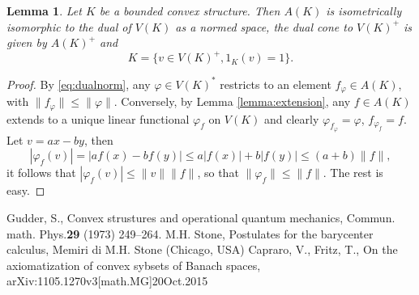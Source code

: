\documentclass[12pt,letterpaper]{article}
\newtheorem{lemma}{Lemma}[section]
\begin{document}
\begin{lemma} Let $K$ be a bounded convex structure. Then  $A(K)$ is isometrically isomorphic to the dual of $V(K)$ as a normed space,  the dual cone to $V(K)^+$ is given by $A(K)^+$ and 
\[
K=\{v\in V(K)^+, 1_K(v)=1\}.
\]
\end{lemma}

\begin{proof} By \eqref{eq:dualnorm}, any $\varphi\in V(K)^*$ restricts to an  element  
 $f_\varphi\in A(K)$, with $\|f_\varphi\|\le \|\varphi\|$.  Conversely, by Lemma \ref{lemma:extension}, any $f\in A(K)$ extends to a unique linear functional $\varphi_f$ on $V(K)$
and clearly $\varphi_{f_\varphi}=\varphi$, $f_{\varphi_f}=f$. Let $v=ax-by$, then
\[
|\varphi_f(v)|=|af(x)-bf(y)|\le a|f(x)|+b|f(y)|\le (a+b)\|f\|,
\]
it follows that $|\varphi_f(v)|\le \|v\|\|f\|$, so that $\|\varphi_f\|\le \|f\|$. The rest is easy.


\end{proof}







\begin{thebibliography}{WWW}
 Gudder, S., Convex strustures and operational quantum mechanics, Commun. math. Phys.{\bf 29} (1973) 249--264.
 M.H. Stone, Postulates for the barycenter calculus, Memiri di M.H. Stone (Chicago, USA)
 Capraro, V., Fritz, T., On the axiomatization of convex sybsets of Banach spaces, arXiv:1105.1270v3[math.MG]20Oct.2015
\end{thebibliography}
\end{document}
